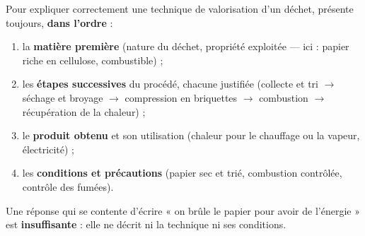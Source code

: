 \documentclass[11pt]{article}
\begin{document}
\begin{methode}
Pour expliquer correctement une technique de valorisation d'un déchet, présente toujours, \textbf{dans l'ordre} :
\begin{enumerate}
\item la \textbf{matière première} (nature du déchet, propriété exploitée — ici : papier riche en cellulose, combustible) ;
\item les \textbf{étapes successives} du procédé, chacune justifiée (collecte et tri $\rightarrow$ séchage et broyage $\rightarrow$ compression en briquettes $\rightarrow$ combustion $\rightarrow$ récupération de la chaleur) ;
\item le \textbf{produit obtenu} et son utilisation (chaleur pour le chauffage ou la vapeur, électricité) ;
\item les \textbf{conditions et précautions} (papier sec et trié, combustion contrôlée, contrôle des fumées).
\end{enumerate}
Une réponse qui se contente d'écrire « on brûle le papier pour avoir de l'énergie » est \textbf{insuffisante} : elle ne décrit ni la technique ni ses conditions.
\end{methode}
\end{document}
